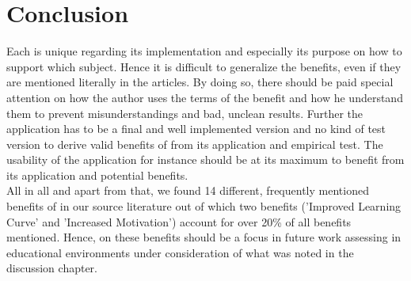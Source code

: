 \section{Conclusion}
Each \AR \app is unique regarding its implementation and especially its purpose on how to support which subject. Hence it is difficult to generalize the benefits, even if they are mentioned literally in the articles.
By doing so, there should be paid special attention on how the author uses the terms of the benefit and how he understand them to prevent misunderstandings and bad, unclean results. Further the application has to be a final 
and well implemented version and no kind of test version to derive valid benefits of \AR from its application and empirical test. The usability of the \AR application for instance should be at its maximum to 
benefit from its application and potential benefits. \\
All in all and apart from that, we found 14 different, frequently mentioned benefits of \AR in our source literature out of which two benefits ('Improved Learning Curve' and 'Increased Motivation') account for over 20\% 
of all benefits mentioned. Hence, on these benefits should be a focus in future work assessing \AR \apps in educational environments under consideration of what was noted in the discussion chapter.


